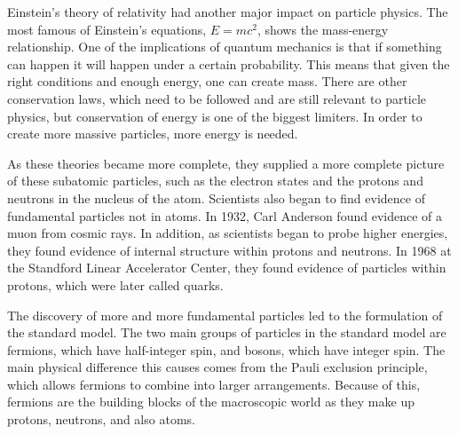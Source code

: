 Einstein's theory of relativity had another major impact on particle physics. The most famous of Einstein's equations, $E = mc^2$, shows the mass-energy relationship. One of the implications of quantum mechanics is that if something can happen it will happen under a certain probability. This means that given the right conditions and enough energy, one can create mass. There are other conservation laws, which need to be followed and are still relevant to particle physics, but conservation of energy is one of the biggest limiters. In order to create more massive particles, more energy is needed. 

As these theories became more complete, they supplied a more complete picture of these subatomic particles, such as the electron states and the protons and neutrons in the nucleus of the atom. Scientists also began to find evidence of fundamental particles not in atoms. In 1932, Carl Anderson found evidence of a muon from cosmic rays. In addition, as scientists began to probe higher energies, they found evidence of internal structure within protons and neutrons. In 1968 at the Standford Linear Accelerator Center, they found evidence of particles within protons, which were later called quarks.

The discovery of more and more fundamental particles led to the formulation of the standard model. The two main groups of particles in the standard model are fermions, which have half-integer spin, and bosons, which have integer spin. The main physical difference this causes comes from the Pauli exclusion principle, which allows fermions to combine into larger arrangements. Because of this, fermions are the building blocks of the macroscopic world as they make up protons, neutrons, and also atoms.   

